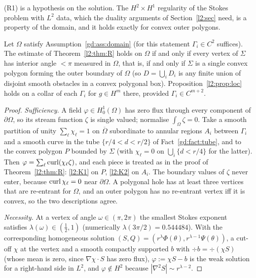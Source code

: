 (R1) is a hypothesis on the solution. The $H^2\times H^1$ regularity of the Stokes problem with $L^2$ data, which the duality arguments of Section~\ref{l2:sec} need, is a property of the domain, and it holds exactly for convex outer polygons.

\begin{theorem}\label{gd:thm:R}
Let $\Omega$ satisfy Assumption~\ref{gd:ass:domain} (for this statement $\Gamma_i\in C^2$ suffices). The estimate of Theorem~\ref{l2:thm:R} holds on $\Omega$ if and only if every vertex of $\Sigma$ has interior angle $<\pi$ measured in $\Omega$, that is, if and only if $\Sigma$ is a single convex polygon forming the outer boundary of $\Omega$ (so $D=\bigcup_iD_i$ is any finite union of disjoint smooth obstacles in a convex polygonal box). Proposition~\ref{l2:prop:loc} holds on a collar of each $\Gamma_i$ for $g\in H^m$ there, provided $\Gamma_i\in C^{m+2}$.
\end{theorem}

\begin{proof}
\emph{Sufficiency.} A field $\varphi\in H^1_0(\Omega)$ has zero flux through every component of $\partial\Omega$, so its stream function $\zeta$ is single valued; normalise $\int_\Omega\zeta=0$. Take a smooth partition of unity $\sum_\ell\chi_\ell=1$ on $\overline\Omega$ subordinate to annular regions $A_i$ between $\Gamma_i$ and a smooth curve in the tube $\{r/4<d<r/2\}$ of Fact~\ref{gd:fact:tube}, and to the convex polygon $P$ bounded by $\Sigma$ (with $\chi_\ell=0$ on $\bigcup_i\{d<r/4\}$ for the latter). Then $\varphi=\sum_\ell\operatorname{curl}(\chi_\ell\zeta)$, and each piece is treated as in the proof of Theorem~\ref{l2:thm:R}: \ref{l2:K1} on $P$, \ref{l2:K2} on $A_i$. The boundary values of $\zeta$ never enter, because $\operatorname{curl}\chi_\ell=0$ near $\partial\Omega$. A polygonal hole has at least three vertices that are re-entrant for $\Omega$, and an outer polygon has no re-entrant vertex iff it is convex, so the two descriptions agree.

\emph{Necessity.} At a vertex of angle $\omega\in(\pi,2\pi)$ the smallest Stokes exponent satisfies $\lambda(\omega)\in(\frac12,1)$ \cite{Dauge1989} (numerically $\lambda(3\pi/2)=0.544484$). With the corresponding homogeneous solution $(S,Q)=(r^\lambda\Phi(\theta),r^{\lambda-1}\Psi(\theta))$, a cut-off $\chi$ at the vertex and a smooth compactly supported $b$ with $\div b=\div(\chi S)$ (whose mean is zero, since $\nabla\chi\cdot S$ has zero flux), $\varphi:=\chi S-b$ is the weak solution for a right-hand side in $L^2$, and $\varphi\notin H^2$ because $|\nabla^2S|\sim r^{\lambda-2}$.
\end{proof}

